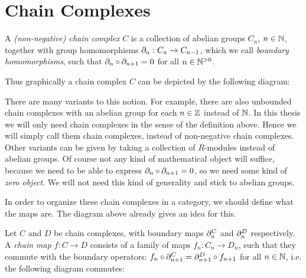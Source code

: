 \section{Chain Complexes}
\label{sec:Chain Complexes}
\begin{definition}
	A \emph{(non-negative) chain complex} $C$ is a collection of abelian groups $C_n$, $n \in \mathbb{N}$, together with group homomorphisms $\partial_n: C_n \to C_{n-1}$, which we call \emph{boundary homomorphisms}, such that $\partial_n \circ \partial_{n+1} = 0$ for all $n \in {\mathbb{N}^{>0}}$.
\end{definition}

Thus graphically a chain complex $C$ can be depicted by the following diagram:
\begin{center}
\end{center}

There are many variants to this notion. For example, there are also unbounded chain complexes with an abelian group for each $n \in \mathbb{Z}$ instead of $\mathbb{N}$. In this thesis we will only need chain complexes in the sense of the definition above. Hence we will simply call them chain complexes, instead of non-negative chain complexes. Other variants can be given by taking a collection of $R$-modules instead of abelian groups. Of course not any kind of mathematical object will suffice, because we need to be able to express $\partial_n \circ \partial_{n+1} = 0$, so we need some kind of \emph{zero object}. We will not need this kind of generality and stick to abelian groups.

In order to organize these chain complexes in a category, we should define what the maps are. The diagram above already gives an idea for this.
\begin{definition}
	Let $C$ and $D$ be chain complexes, with boundary maps $\partial^C_n$ and $\partial^D_n$ respectively. A \emph{chain map} $f: C \to D$ consists of a family of maps $f_n: C_n \to D_n$, such that they commute with the boundary operators: $f_n \circ \partial^C_{n+1} = \partial^D_{n+1} \circ f_{n+1}$ for all $n \in \mathbb{N}$, i.e. the following diagram commutes:
	\begin{center}
	\end{center}
\end{definition}


